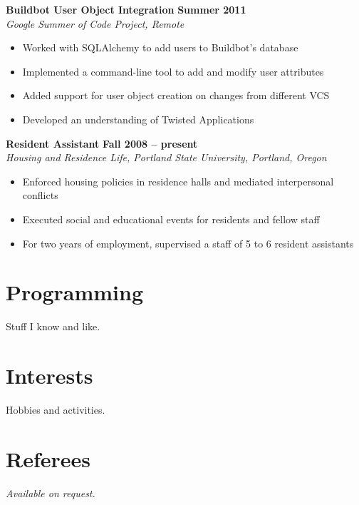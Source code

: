 \documentclass[margin,line]{resume}
\begin{document}
\begin{resume}
    \textbf{Buildbot User Object Integration}    \hfill \textbf{Summer 2011}    \vspace{2mm}\\\vspace{1mm}%
    \textsl{Google Summer of Code Project, Remote}
    \begin{itemize}
        \item Worked with SQLAlchemy to add users to Buildbot's database
        \item Implemented a command-line tool to add and modify user attributes
        \item Added support for user object creation on changes from different VCS
        \item Developed an understanding of Twisted Applications
    \end{itemize}

    \textbf{Resident Assistant}    \hfill \textbf{Fall 2008 -- present}    \vspace{2mm}\\\vspace{1mm}%
    \textsl{Housing and Residence Life, Portland State University, Portland, Oregon}
    \begin{itemize}
        \item Enforced housing policies in residence halls and mediated interpersonal conflicts
        \item Executed social and educational events for residents and fellow staff
        \item For two years of employment, supervised a staff of 5 to 6 resident assistants
    \end{itemize}

    \section{\mysidestyle Programming}

    Stuff I know and like.

    \section{\mysidestyle Interests}

    Hobbies and activities.

    \section{\mysidestyle Referees}
    {\sl Available on request.}


\end{resume}
\end{document}
